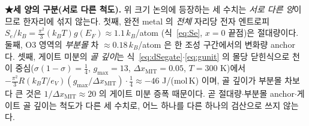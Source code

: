\documentclass[11pt,a4paper]{article}
\begin{document}
\textbf{★세 양의 구분(서로 다른 척도).} 위 크기 논의에 등장하는 세 수치는 \emph{서로 다른 양}이므로 한자리에 섞지
않는다. 첫째, 완전 metal 의 \emph{전체} 자리당 전자 엔트로피 $S_e/k_B=\tfrac{\pi^2}{3}(k_BT)g(E_F)\approx1.1\,k_B$/atom
(식~\eqref{eq:Se}, $x{=}0$ 끝점)은 절대량이다. 둘째, O3 영역의 \emph{부분몰} 차 $\approx0.18\,k_B$/atom\cite{reynier2004}
은 한 조성 구간에서의 변화량 anchor 다. 셋째, 게이트 미분의 \emph{골 깊이}는 식~\eqref{eq:dSegate}$\cdot$\eqref{eq:gunit}
의 몰당 닫힌식으로 천이 중심($\sigma(1-\sigma)=\tfrac14$, $g_{\max}{=}13$, $\Delta x_\mathrm{MIT}{=}0.05$, $T{=}300$ K)에서
$-\tfrac{\pi^2}{3}R(k_BT/e_V)(g_{\max}/\Delta x_\mathrm{MIT})\cdot\tfrac14\approx-46$ J/(mol\,K) 이며, 골 깊이가 부분몰 차보다
큰 것은 $1/\Delta x_\mathrm{MIT}\approx20$ 의 게이트 미분 증폭 때문이다. 곧 절대량$\cdot$부분몰 anchor$\cdot$게이트 골
깊이는 척도가 다른 세 수치로, 어느 하나를 다른 하나의 검산으로 쓰지 않는다.
\end{document}
